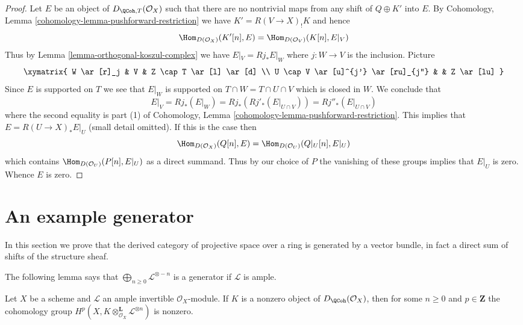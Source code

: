 \begin{proof}
\medskip\noindent
Let $E$ be an object of $D_{\QCoh, T}(\mathcal{O}_X)$ such that
there are no nontrivial maps from any shift of $Q \oplus K'$ into $E$.
By Cohomology, Lemma \ref{cohomology-lemma-pushforward-restriction}
we have $K' =  R(V \to X)_! K$ and hence
$$
\Hom_{D(\mathcal{O}_X)}(K'[n], E) = \Hom_{D(\mathcal{O}_V)}(K[n], E|_V)
$$
Thus by Lemma \ref{lemma-orthogonal-koszul-complex} we have
$E|_V = Rj_*E|_W$ where $j : W \to V$ is the inclusion. Picture
$$
\xymatrix{
W \ar[r]_j & V & Z \cap T \ar[l] \ar[d] \\
U \cap V \ar[u]^{j'} \ar[ru]_{j''} & & Z \ar[lu]
}
$$
Since $E$ is supported on $T$ we see that $E|_W$ is supported on
$T \cap W = T \cap U \cap V$ which is closed in $W$.
We conclude that
$$
E|_V = Rj_*(E|_W) = Rj_*(Rj'_*(E|_{U \cap V})) = Rj''_*(E|_{U \cap V})
$$
where the second equality is part (1) of
Cohomology, Lemma \ref{cohomology-lemma-pushforward-restriction}.
This implies that $E = R(U \to X)_*E|_U$ (small detail omitted). If
this is the case then
$$
\Hom_{D(\mathcal{O}_X)}(Q[n], E) = \Hom_{D(\mathcal{O}_U)}(Q|_U[n], E|_U)
$$
which contains $\Hom_{D(\mathcal{O}_U)}(P[n], E|_U)$ as a direct summand.
Thus by our choice of $P$ the vanishing of these groups implies that $E|_U$
is zero. Whence $E$ is zero.
\end{proof}



\section{An example generator}
\label{section-example-generator}

\noindent
In this section we prove that the derived category of projective
space over a ring is generated by a vector bundle, in fact a direct
sum of shifts of the structure sheaf.

\medskip\noindent
The following lemma says that $\bigoplus_{n \geq 0} \mathcal{L}^{\otimes -n}$
is a generator if $\mathcal{L}$ is ample.

\begin{lemma}
\label{lemma-nonzero-some-cohomology}
Let $X$ be a scheme and $\mathcal{L}$ an ample invertible
$\mathcal{O}_X$-module. If $K$ is a nonzero object of
$D_\QCoh(\mathcal{O}_X)$, then for some $n \geq 0$ and $p \in \mathbf{Z}$
the cohomology group
$H^p(X, K \otimes_{\mathcal{O}_X}^\mathbf{L} \mathcal{L}^{\otimes n})$
is nonzero.
\end{lemma}

